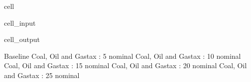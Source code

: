 \documentclass[letterpaper,10pt,english]{jupyterBook}
\begin{document}
\begin{sphinxuseclass}{cell}\begin{sphinxVerbatimInput}

\begin{sphinxuseclass}{cell_input}
\begin{sphinxVerbatim}[commandchars=\\\{\}]
   
\end{sphinxVerbatim}

\end{sphinxuseclass}\end{sphinxVerbatimInput}
\begin{sphinxVerbatimOutput}

\begin{sphinxuseclass}{cell_output}
\begin{sphinxVerbatim}[commandchars=\\\{\}]
Baseline
Coal, Oil and Gastax : 5 nominal
Coal, Oil and Gastax : 10 nominal
Coal, Oil and Gastax : 15 nominal
Coal, Oil and Gastax : 20 nominal
Coal, Oil and Gastax : 25 nominal
\end{sphinxVerbatim}

\end{sphinxuseclass}\end{sphinxVerbatimOutput}

\end{sphinxuseclass}
\end{document}
